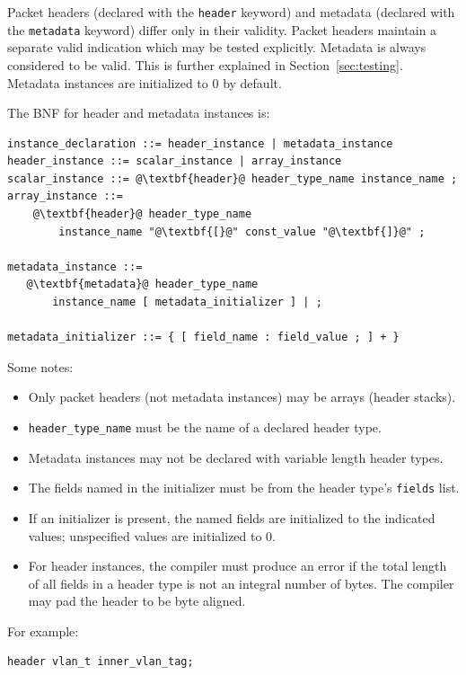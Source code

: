 \documentclass[12pt]{article}
\begin{document}
Packet headers (declared with the \texttt{header} keyword) and metadata (declared
with the \texttt{metadata} keyword) differ only in their validity. Packet headers
maintain a separate valid indication which may be tested explicitly. Metadata
is always considered to be valid. This is further explained in
Section~\ref{sec:testing}.  Metadata instances are
initialized to 0 by default.

The BNF for header and metadata instances is:

\begin{lstlisting}[frame=single,backgroundcolor=\color{bnfgreen},escapechar=\@]
instance_declaration ::= header_instance | metadata_instance
header_instance ::= scalar_instance | array_instance
scalar_instance ::= @\textbf{header}@ header_type_name instance_name ;
array_instance ::=
    @\textbf{header}@ header_type_name
        instance_name "@\textbf{[}@" const_value "@\textbf{]}@" ;

metadata_instance ::=
   @\textbf{metadata}@ header_type_name
       instance_name [ metadata_initializer ] | ;

metadata_initializer ::= { [ field_name : field_value ; ] + }
\end{lstlisting}


Some notes:

\begin{itemize}
\item
Only packet headers (not metadata instances) may be arrays (header stacks).
\item
\texttt{header_type_name} must be the name of a declared header type.
\item
Metadata instances may not be declared with variable length header types.
\item
The fields named in the initializer must be from the header type's \texttt{fields} list.
\item
If an initializer is present, the named fields are initialized to the indicated
values; unspecified values are initialized to 0.
\item
For header instances, the compiler must produce an error if the total length
of all fields in a header type is not an integral number of bytes. The compiler
may pad the header to be byte aligned.
\end{itemize}


For example:

\begin{lstlisting}[keywords={},frame=single,escapechar=\@]
header vlan_t inner_vlan_tag;
\end{lstlisting}
\end{document}
